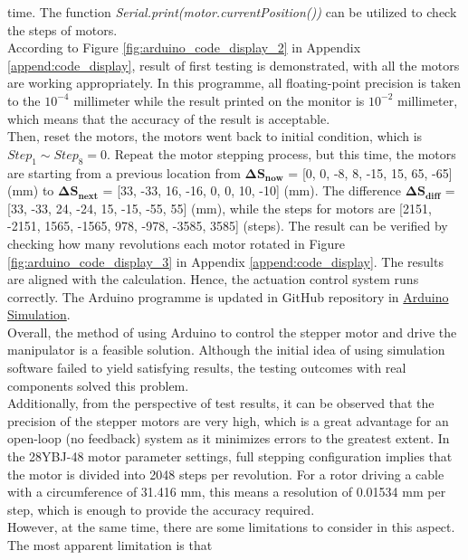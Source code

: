 time. The function \emph{Serial.print(motor.currentPosition())} can be utilized to check the steps of motors.\\
According to Figure \ref{fig:arduino_code_display_2} in Appendix \ref{append:code_display}, result of first testing 
is demonstrated, with all the motors are working appropriately. In this programme, all floating-point precision 
is taken to the $10^{-4}$ millimeter while the result printed on the monitor is $10^{-2}$ millimeter, 
which means that the accuracy of the result is acceptable.\\
Then, reset the motors, the motors went back to initial condition, which is $Step_1 \sim Step_8=0$. Repeat the 
motor stepping process, but this time, the motors are starting from a previous location from
$\boldsymbol{\Delta S_{now}}$ = [0, 0, -8, 8, -15, 15, 65, -65] (mm) to $\boldsymbol{\Delta S_{next}}$ = 
[33, -33, 16, -16, 0, 0, 10, -10] (mm). The difference $\boldsymbol{\Delta S_{diff}}$ = 
[33, -33, 24, -24, 15, -15, -55, 55] (mm), while the steps for motors are 
[2151, -2151, 1565, -1565, 978, -978, -3585, 3585] (steps). The result can be verified by checking how many 
revolutions each motor rotated in Figure \ref{fig:arduino_code_display_3} in Appendix \ref{append:code_display}.
The results are aligned with the calculation. Hence, the actuation control system runs correctly.
The Arduino programme is updated in GitHub repository in 
\href{https://github.com/yezehao/Compact-Continuum-Manipulator-Platform/tree/main/Arduino-Simulation}
{Arduino Simulation}. \\
Overall, the method of using Arduino to control the stepper motor and drive the manipulator is a feasible solution. 
Although the initial idea of using simulation software failed to yield satisfying results, the testing outcomes with 
real components solved this problem.\\
Additionally, from the perspective of test results, it can be observed that the precision of the stepper motors are 
very high, which is a great advantage for an open-loop (no feedback) system as it minimizes errors to the greatest 
extent. In the 28YBJ-48 motor parameter settings, full stepping configuration implies that the motor is divided into 
2048 steps per revolution. For a rotor driving a cable with a circumference of 31.416 mm, this means a resolution of 
0.01534 mm per step, which is enough to provide the accuracy required.\\
However, at the same time, there are some limitations to consider in this aspect. The most apparent limitation is that 
